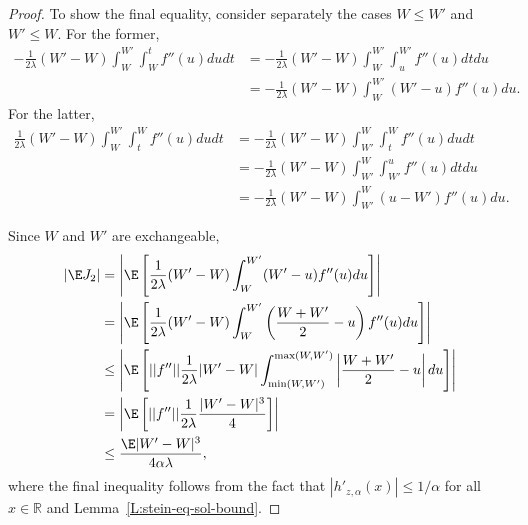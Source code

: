 \begin{proof}
  To show the final equality, consider separately the cases $W \leq W'$ and $W' \leq W$.  For the
  former,
  \begin{equation*}
    \begin{split}
      -\frac{1}{2 \lambda}(W'-W)\int_{W}^{W'}\int_W^t f''(u) du dt
      &= -\frac{1}{2 \lambda}(W'-W)\int_{W}^{W'}\int_u^{W'} f''(u) dt du \\
      &= -\frac{1}{2 \lambda}(W'-W)\int_{W}^{W'} (W'-u)f''(u) du.
    \end{split}
  \end{equation*}
  For the latter,
  \begin{equation*}
    \begin{split}
      \frac{1}{2 \lambda}(W'-W)\int_{W}^{W'}\int_t^W f''(u) du dt
      &= -\frac{1}{2 \lambda}(W'-W)\int_{W'}^{W}\int_t^{W} f''(u) du dt \\
      &= -\frac{1}{2 \lambda}(W'-W)\int_{W'}^{W}\int_{W'}^{u} f''(u) dt du \\
      &= -\frac{1}{2 \lambda}(W'-W)\int_{W'}^{W}(u-W')f''(u) du.
    \end{split}
  \end{equation*}

  Since $W$ and $W'$ are exchangeable,
  \begin{equation}
    \begin{split}
      |\E J_2| &= \left | \E \left [ \frac{1}{2 \lambda}(W'-W)\int_W^{W'} (W'-u)f''(u) du
        \right ] \right | \\
      &= \left | \E \left [ \frac{1}{2 \lambda}(W'-W)\int_W^{W'} \left ( \frac{W+W'}{2}-u \right )
        f''(u) du \right ] \right | \\
    &\leq \left | \E \left [ ||f''|| \frac{1}{2\lambda}|W'-W|\int_{\min(W,W')}^{\max(W,W')} \left |
          \frac{W+W'}{2} -u \right | du \right ] \right | \\
    &= \left | \E \left [ ||f''|| \frac{1}{2\lambda}\frac{|W'-W|^3}{4}
      \right ] \right | \\
    &\leq \frac{\E |W'-W|^3}{4 \alpha \lambda},
    \end{split}
  \end{equation}
  where the final inequality follows from the fact that $|h'_{z,\alpha}(x)|\leq 1/\alpha$ for all $x
  \in \mathbb{R}$ and Lemma~\ref{L:stein-eq-sol-bound}.


\end{proof}
